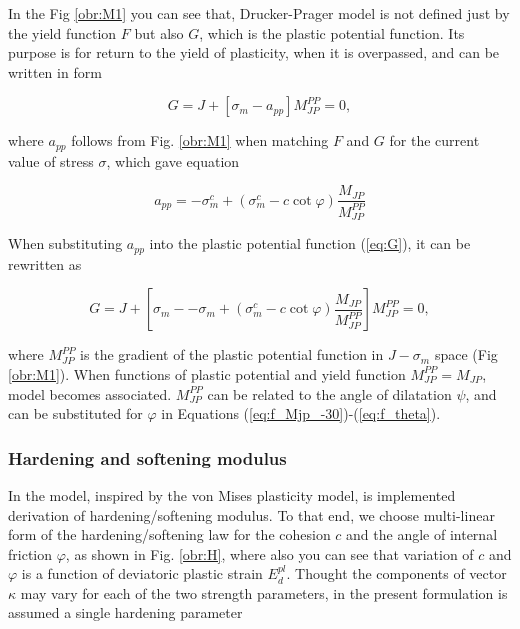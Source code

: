 In the Fig \ref{obr:M1} you can see that, Drucker-Prager model is not defined just by the yield function $F$ but also $G$, which is the plastic potential function. Its purpose is for return to the yield of plasticity, when it is overpassed, and can be written in form 

\begin{equation}\label{eq:G}
	G = J + \left[ \sigma_m - a_{pp} \right] M_{JP}^{PP} = 0,
\end{equation}

where $a_{pp}$ follows from Fig. \ref{obr:M1} when matching $F$ and $G$ for the current value of stress $\sigma$, which gave equation

\begin{equation}\label{eq:app}
	a_{pp} = - \sigma_m^c + ( \sigma_m^c - c\cot\varphi) \dfrac{M_{JP}}{M_{JP}^{PP}}
\end{equation} 

When substituting $a_{pp}$ into the plastic potential function (\ref{eq:G}), it can be rewritten as 

\begin{equation}\label{eq:plastic_potential}
	G = J + \left[ \sigma_m - - \sigma_m + ( \sigma_m^c - c\cot\varphi) \dfrac{M_{JP}}{M_{JP}^{PP}} \right] M_{JP}^{PP} = 0,
\end{equation}

where $M_{JP}^{PP}$ is the gradient of the plastic potential function in $J-\sigma_m$ space (Fig \ref{obr:M1}). When functions of plastic potential and yield function  $M_{JP}^{PP}=M_{JP}$, model becomes associated. $M_{JP}^{PP}$  can be related to the angle of dilatation $\psi$, and can be substituted for $\varphi$ in Equations (\ref{eq:f_Mjp_-30})-(\ref{eq:f_theta}).
 
\subsubsection{Hardening and softening modulus}
\indent

In the model, inspired by the von Mises plasticity model, is implemented derivation of hardening/softening modulus. To that end, we choose multi-linear form of the hardening/softening law for the cohesion $c$ and the angle of internal friction $\varphi$, as shown in Fig. \ref{obr:H}, where also you can see that variation of $c$ and $\varphi$ is a function of deviatoric plastic strain $E_d^{pl}$. Thought the components of vector $\kappa$ may vary for each of the two strength parameters, in the present formulation is assumed a single hardening parameter

